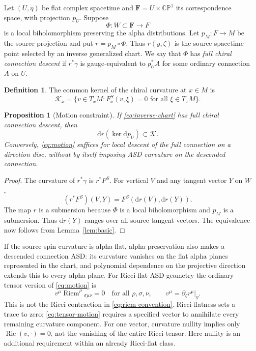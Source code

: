 \documentclass[11pt]{article}
\numberwithin{equation}{section}
\newtheorem{proposition}[theorem]{Proposition}
\theoremstyle{definition}
\newtheorem{definition}[theorem]{Definition}
\theoremstyle{remark}
\newcommand{\CP}{\mathbb{CP}}
\newcommand{\dd}{\mathrm d}
\newcommand{\Riem}{\operatorname{Riem}}
\newcommand{\Ric}{\operatorname{Ric}}
\newcommand{\calK}{\mathcal K}
\newcommand{\flatF}{\mathbf F}
\begin{document}
Let $(U,\eta)$ be flat complex spacetime and $\flatF=U\times\CP^1$ its correspondence space, with projection $p_U$. Suppose
\begin{equation}\label{eq:inverse-chart}
\Phi:W\subset\flatF\longrightarrow F
\end{equation}
is a local biholomorphism preserving the alpha distributions. Let $p_M:F\to M$ be the source projection and put $r=p_M\circ\Phi$. Thus $r(y,\zeta)$ is the source spacetime point selected by an inverse generalized chart. We say that $\Phi$ has \emph{full chiral connection descent} if $r^*\gamma$ is gauge-equivalent to $p_U^*A$ for some ordinary connection $A$ on $U$.

\begin{definition}\label{def:nullity}
The common kernel of the chiral curvature at $x\in M$ is
\begin{equation}\label{eq:nullity}
\calK_x=\{v\in T_xM:F^S_x(v,\xi)=0\text{ for all }\xi\in T_xM\}.
\end{equation}
\end{definition}

\begin{proposition}[Motion constraint]\label{prop:motion}
If \eqref{eq:inverse-chart} has full chiral connection descent, then
\begin{equation}\label{eq:motion}
\dd r(\ker\dd p_U)\subset\calK.
\end{equation}
Conversely, \eqref{eq:motion} suffices for local descent of the full connection on a direction disc, without by itself imposing ASD curvature on the descended connection.
\end{proposition}
\begin{proof}
The curvature of $r^*\gamma$ is $r^*F^S$. For vertical $V$ and any tangent vector $Y$ on $W$,
\[
(r^*F^S)(V,Y)=F^S(\dd r(V),\dd r(Y)).
\]
The map $r$ is a submersion because $\Phi$ is a local biholomorphism and $p_M$ is a submersion. Thus $\dd r(Y)$ ranges over all source tangent vectors. The equivalence now follows from Lemma~\ref{lem:basic}.
\end{proof}

If the source spin curvature is alpha-flat, alpha preservation also makes a descended connection ASD: its curvature vanishes on the flat alpha planes represented in the chart, and polynomial dependence on the projective direction extends this to every alpha plane. For Ricci-flat ASD geometry the ordinary tensor version of \eqref{eq:motion} is
\begin{equation}\label{eq:tensor-motion}
v^\mu\Riem^\rho{}_{\sigma\mu\nu}=0
\quad\text{for all }\rho,\sigma,\nu,
\qquad v^\mu=\partial_\zeta r^\mu\big|_y.
\end{equation}
This is not the Ricci contraction in \eqref{eq:riem-convention}. Ricci-flatness sets a trace to zero; \eqref{eq:tensor-motion} requires a specified vector to annihilate every remaining curvature component. For one vector, curvature nullity implies only $\Ric(v,\cdot)=0$, not the vanishing of the entire Ricci tensor. Here nullity is an additional requirement within an already Ricci-flat class.
\end{document}
